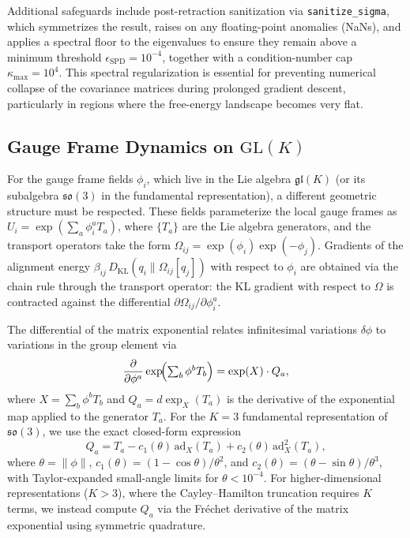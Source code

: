 \documentclass[twoside,11pt]{article}
\begin{document}
Additional safeguards include post-retraction sanitization via
\texttt{sanitize\_sigma}, which symmetrizes the result, raises on any
floating-point anomalies (NaNs), and applies a spectral floor to the
eigenvalues to ensure they remain above a minimum threshold
$\epsilon_{\mathrm{SPD}} = 10^{-4}$, together with a condition-number cap
$\kappa_{\max} = 10^{4}$.  This spectral regularization is essential for
preventing numerical collapse of the covariance matrices during prolonged
gradient descent, particularly in regions where the free-energy landscape
becomes very flat.

\subsection{Gauge Frame Dynamics on $\mathrm{GL}(K)$}
For the gauge frame fields $\phi_i$, which live in the Lie algebra $\mathfrak{gl}(K)$ (or its subalgebra $\mathfrak{so}(3)$ in the fundamental representation), a different geometric structure must be respected. These fields parameterize the local gauge frames as $U_i = \exp(\sum_a \phi_i^a T_a)$, where $\{T_a\}$ are the Lie algebra generators, and the transport operators take the form $\Omega_{ij} = \exp(\phi_i)\exp(-\phi_j)$.  Gradients of the alignment energy $\beta_{ij}\,D_{\mathrm{KL}}(q_i \| \Omega_{ij}[q_j])$ with respect to $\phi_i$ are obtained via the chain rule through the transport operator: the KL gradient with respect to $\Omega$ is contracted against the differential $\partial\Omega_{ij}/\partial\phi_i^a$.

The differential of the matrix exponential relates infinitesimal variations $\delta \phi$ to variations in the group element via
\begin{equation}
\frac{\partial}{\partial \phi^a}\exp\!\Bigl(\textstyle\sum_b \phi^b T_b\Bigr) = \exp(X)\cdot Q_a,
\end{equation}
where $X = \sum_b \phi^b T_b$ and $Q_a = d\exp_X(T_a)$ is the derivative of the exponential map applied to the generator $T_a$.  For the $K\!=\!3$ fundamental representation of $\mathfrak{so}(3)$, we use the exact closed-form expression
\begin{equation}
Q_a = T_a - c_1(\theta)\,\mathrm{ad}_X(T_a) + c_2(\theta)\,\mathrm{ad}_X^2(T_a),
\end{equation}
where $\theta = \|\phi\|$, $c_1(\theta) = (1-\cos\theta)/\theta^2$, and $c_2(\theta) = (\theta - \sin\theta)/\theta^3$, with Taylor-expanded small-angle limits for $\theta < 10^{-4}$.  For higher-dimensional representations ($K > 3$), where the Cayley--Hamilton truncation requires $K$ terms, we instead compute $Q_a$ via the Fr\'{e}chet derivative of the matrix exponential using symmetric quadrature.
\end{document}
